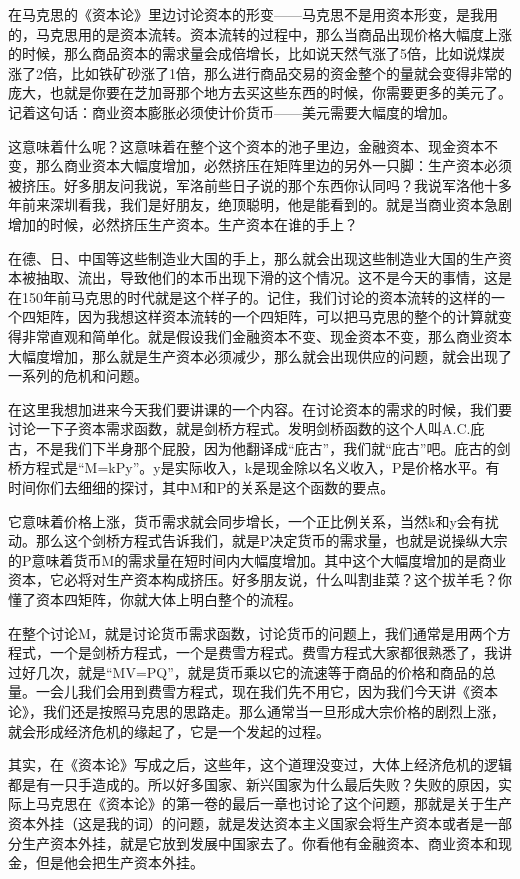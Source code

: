 \documentclass[UTF8, 12pt, a4paper]{ctexrep}
\begin{document}
在马克思的《资本论》里边讨论资本的形变——马克思不是用资本形变，是我用的，马克思用的是资本流转。资本流转的过程中，那么当商品出现价格大幅度上涨的时候，那么商品资本的需求量会成倍增长，比如说天然气涨了5倍，比如说煤炭涨了2倍，比如铁矿砂涨了1倍，那么进行商品交易的资金整个的量就会变得非常的庞大，也就是你要在芝加哥那个地方去买这些东西的时候，你需要更多的美元了。记着这句话：商业资本膨胀必须使计价货币——美元需要大幅度的增加。

这意味着什么呢？这意味着在整个这个资本的池子里边，金融资本、现金资本不变，那么商业资本大幅度增加，必然挤压在矩阵里边的另外一只脚：生产资本必须被挤压。好多朋友问我说，军洛前些日子说的那个东西你认同吗？我说军洛他十多年前来深圳看我，我们是好朋友，绝顶聪明，他是能看到的。就是当商业资本急剧增加的时候，必然挤压生产资本。生产资本在谁的手上？

在德、日、中国等这些制造业大国的手上，那么就会出现这些制造业大国的生产资本被抽取、流出，导致他们的本币出现下滑的这个情况。这不是今天的事情，这是在150年前马克思的时代就是这个样子的。记住，我们讨论的资本流转的这样的一个四矩阵，因为我想这样资本流转的一个四矩阵，可以把马克思的整个的计算就变得非常直观和简单化。就是假设我们金融资本不变、现金资本不变，那么商业资本大幅度增加，那么就是生产资本必须减少，那么就会出现供应的问题，就会出现了一系列的危机和问题。

在这里我想加进来今天我们要讲课的一个内容。在讨论资本的需求的时候，我们要讨论一下子资本需求函数，就是剑桥方程式。发明剑桥函数的这个人叫A.C.庇古，不是我们下半身那个屁股，因为他翻译成“庇古”，我们就“庇古”吧。庇古的剑桥方程式是“M=kPy”。y是实际收入，k是现金除以名义收入，P是价格水平。有时间你们去细细的探讨，其中M和P的关系是这个函数的要点。

它意味着价格上涨，货币需求就会同步增长，一个正比例关系，当然k和y会有扰动。那么这个剑桥方程式告诉我们，就是P决定货币的需求量，也就是说操纵大宗的P意味着货币M的需求量在短时间内大幅度增加。其中这个大幅度增加的是商业资本，它必将对生产资本构成挤压。好多朋友说，什么叫割韭菜？这个拔羊毛？你懂了资本四矩阵，你就大体上明白整个的流程。

在整个讨论M，就是讨论货币需求函数，讨论货币的问题上，我们通常是用两个方程式，一个是剑桥方程式，一个是费雪方程式。费雪方程式大家都很熟悉了，我讲过好几次，就是“MV=PQ”，就是货币乘以它的流速等于商品的价格和商品的总量。一会儿我们会用到费雪方程式，现在我们先不用它，因为我们今天讲《资本论》，我们还是按照马克思的思路走。那么通常当一旦形成大宗价格的剧烈上涨，就会形成经济危机的缘起了，它是一个发起的过程。

其实，在《资本论》写成之后，这些年，这个道理没变过，大体上经济危机的逻辑都是有一只手造成的。所以好多国家、新兴国家为什么最后失败？失败的原因，实际上马克思在《资本论》的第一卷的最后一章也讨论了这个问题，那就是关于生产资本外挂（这是我的词）的问题，就是发达资本主义国家会将生产资本或者是一部分生产资本外挂，就是它放到发展中国家去了。你看他有金融资本、商业资本和现金，但是他会把生产资本外挂。
\end{document}
